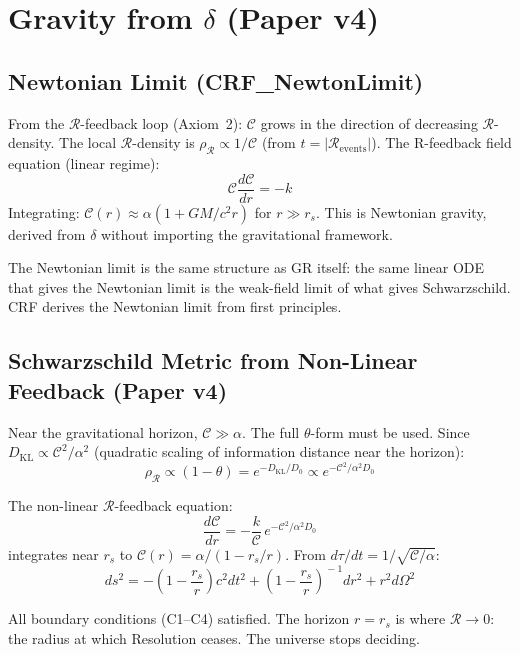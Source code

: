 \documentclass[12pt, a4paper]{article}
\begin{document}
\section{Gravity from $\delta$ (Paper v4)}

\subsection{Newtonian Limit (CRF\_NewtonLimit)}

From the $\mathcal{R}$-feedback loop (Axiom~2): $\mathcal{C}$ grows in the direction of
decreasing $\mathcal{R}$-density. The local $\mathcal{R}$-density is $\rho_\mathcal{R}
\propto 1/\mathcal{C}$ (from $t = |\mathcal{R}_{\mathrm{events}}|$). The R-feedback field
equation (linear regime):
\[ \mathcal{C}\frac{d\mathcal{C}}{dr} = -k \]
Integrating: $\mathcal{C}(r) \approx \alpha\left(1 + GM/c^2 r\right)$ for $r \gg r_s$.
This is Newtonian gravity, derived from $\delta$ without importing the gravitational framework.

The Newtonian limit is the same structure as GR itself: the same linear ODE that gives the
Newtonian limit is the weak-field limit of what gives Schwarzschild. CRF derives the Newtonian
limit from first principles.

\subsection{Schwarzschild Metric from Non-Linear Feedback (Paper v4)}

Near the gravitational horizon, $\mathcal{C} \gg \alpha$. The full $\theta$-form must be
used. Since $D_{\mathrm{KL}} \propto \mathcal{C}^2/\alpha^2$ (quadratic scaling of
information distance near the horizon):
\[ \rho_\mathcal{R} \propto (1-\theta) = e^{-D_{\mathrm{KL}}/D_0}
\propto e^{-\mathcal{C}^2/\alpha^2 D_0} \]

\begin{derivedbox}[title={Schwarzschild from Non-Linear $\mathcal{R}$-Feedback}]
The non-linear $\mathcal{R}$-feedback equation:
\[ \frac{d\mathcal{C}}{dr} = -\frac{k}{\mathcal{C}}\,e^{-\mathcal{C}^2/\alpha^2 D_0} \]
integrates near $r_s$ to $\mathcal{C}(r) = \alpha/(1 - r_s/r)$.
From $d\tau/dt = 1/\sqrt{\mathcal{C}/\alpha}$:
\[
  ds^2 = -\!\left(1-\frac{r_s}{r}\right)c^2 dt^2
  + \left(1-\frac{r_s}{r}\right)^{\!-1}dr^2 + r^2 d\Omega^2
\]

All boundary conditions (C1--C4) satisfied. The horizon $r = r_s$ is where
$\mathcal{R} \to 0$: the radius at which Resolution ceases. The universe stops deciding.
\end{derivedbox}
\end{document}
